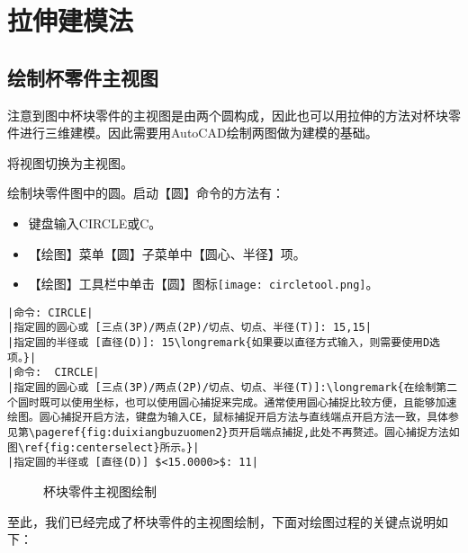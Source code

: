 \section{拉伸建模法}
\subsection{绘制杯零件主视图}
注意到图中杯块零件的主视图是由两个圆构成，因此也可以用拉伸的方法对杯块零件进行三维建模。因此需要用AutoCAD绘制两图做为建模的基础。
\begin{procedure}
\item 将视图切换为主视图。
\item 绘制块零件图中的圆。启动【圆】命令的方法有：
\begin{itemize}
\item 键盘输入CIRCLE或C。
\item 【绘图】菜单【圆】子菜单中【圆心、半径】项。
\item 【绘图】工具栏中单击【圆】图标\texttt{[image: circletool.png]}。
\end{itemize}
\begin{lstlisting}
|命令: CIRCLE|
|指定圆的圆心或 [三点(3P)/两点(2P)/切点、切点、半径(T)]: 15,15|
|指定圆的半径或 [直径(D)]: 15\longremark{如果要以直径方式输入，则需要使用D选项。}|
|命令:  CIRCLE|
|指定圆的圆心或 [三点(3P)/两点(2P)/切点、切点、半径(T)]:\longremark{在绘制第二个圆时既可以使用坐标，也可以使用圆心捕捉来完成。通常使用圆心捕捉比较方便，且能够加速绘图。圆心捕捉开启方法，键盘为输入CE，鼠标捕捉开启方法与直线端点开启方法一致，具体参见第\pageref{fig:duixiangbuzuomen2}页开启端点捕捉,此处不再赘述。圆心捕捉方法如图\ref{fig:centerselect}所示。}|
|指定圆的半径或 [直径(D)] $<15.0000>$: 11|
\end{lstlisting}
\begin{figure}[htbp]
\centering
{}\hspace{20pt}
\caption{杯块零件主视图绘制}
\end{figure}
\end{procedure}

至此，我们已经完成了杯块零件的主视图绘制，下面对绘图过程的关键点说明如下：
\showremarks

